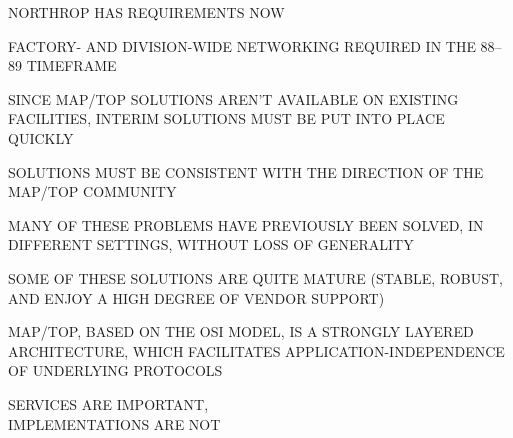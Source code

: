 \begin{bwslide}

\begin{nrtc}
\item	NORTHROP HAS REQUIREMENTS NOW
    \begin{nrtc}
    \item	FACTORY- AND DIVISION-WIDE NETWORKING
		REQUIRED IN THE 88--89 TIMEFRAME
    \item	SINCE MAP/TOP SOLUTIONS AREN'T AVAILABLE ON EXISTING
		FACILITIES,
		INTERIM SOLUTIONS MUST BE PUT INTO PLACE QUICKLY
    \item	SOLUTIONS MUST BE CONSISTENT WITH THE
		DIRECTION OF THE MAP/TOP COMMUNITY
    \end{nrtc}
\end{nrtc}
\end{bwslide}


\begin{bwslide}

\begin{nrtc}
\item	MANY OF THESE PROBLEMS HAVE PREVIOUSLY BEEN SOLVED, IN DIFFERENT
	SETTINGS, WITHOUT LOSS OF GENERALITY
    \begin{nrtc}
    \item	SOME OF THESE SOLUTIONS ARE QUITE MATURE (STABLE, ROBUST,
		AND ENJOY A HIGH DEGREE OF VENDOR SUPPORT)
    \end{nrtc}
\end{nrtc}
\end{bwslide}


\begin{bwslide}

\begin{nrtc}
\item	MAP/TOP, BASED ON THE OSI MODEL, IS A STRONGLY LAYERED ARCHITECTURE,
	WHICH FACILITATES
	APPLICATION-INDEPENDENCE OF UNDERLYING PROTOCOLS
    \begin{nrtc}
    \item	SERVICES ARE IMPORTANT,\\ IMPLEMENTATIONS ARE NOT
    \end{nrtc}
\end{nrtc}
\end{bwslide}


